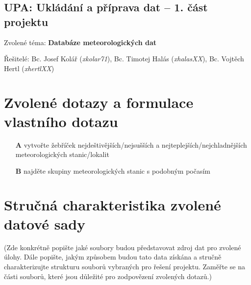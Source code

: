 \documentclass[11pt,a4paper,titlepage]{extarticle}
\begin{document}
\pagestyle{empty}
\begin{center}
	\section*{UPA: Ukládání a příprava dat -- 1. část projektu}
\end{center}

\large{Zvolené téma: \textbf{Databáze meteorologických dat}}

\large{
	Řešitelé:
	Bc. Josef Kolář (\textit{xkolar71}),
	Bc. Timotej Halás (\textit{xhalasXX}),
	Bc. Vojtěch Hertl (\textit{xhertlXX})
}

\section{Zvolené dotazy a formulace vlastního dotazu}

\begin{itemize}
	\item[\textbf{A}] vytvořte žebříček nejdeštivějších/nejsušších a nejteplejších/nejchladnějších meteorologických stanic/lokalit
	\item[\textbf{B}] najděte skupiny meteorologických stanic s podobným počasím
\end{itemize}
\section{Stručná charakteristika zvolené datové sady}
(Zde konkrétně popište jaké soubory budou představovat zdroj dat pro zvolené úlohy. Dále popište, jakým způsobem budou tato data získána a stručně charakterizujte strukturu souborů vybraných pro řešení projektu. Zaměřte se na části souborů, které jsou důležité pro zodpovězení zvolených dotazů.)
\end{document}
